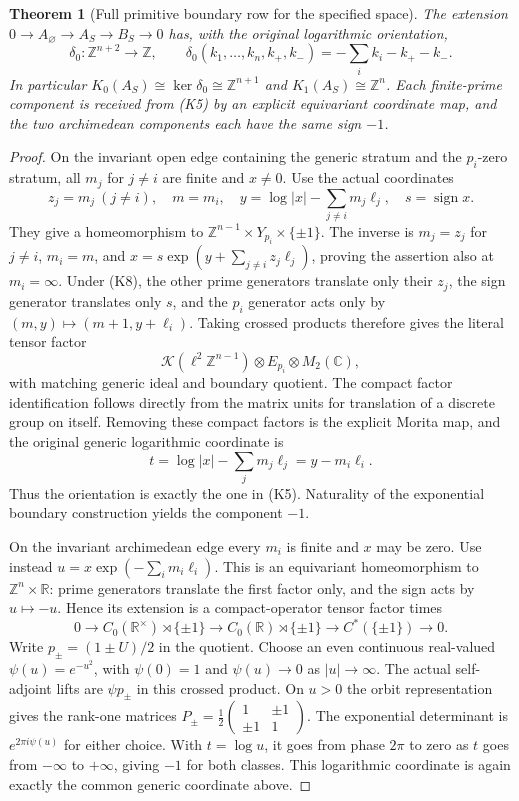 \documentclass[11pt]{article}
\newtheorem{theorem}{Theorem}[section]
\newcommand{\C}{\mathbb C}\newcommand{\R}{\mathbb R}
\begin{document}
\begin{theorem}[Full primitive boundary row for the specified space]
The extension $0\to A_\varnothing\to A_S\to B_S\to0$ has, with
the original logarithmic orientation,
\[
 \delta_0:\mathbb Z^{n+2}\longrightarrow\mathbb Z,
 \qquad
 \delta_0(k_1,\ldots,k_n,k_+,k_-)
       =-\sum_i k_i-k_+-k_-.
 \tag{K9}
\]
In particular
$K_0(A_S)\cong\ker\delta_0\cong\mathbb Z^{n+1}$ and
$K_1(A_S)\cong\mathbb Z^n$. Each finite-prime component is received
from (K5) by an explicit equivariant coordinate map, and the two
archimedean components each have the same sign $-1$.
\end{theorem}
\begin{proof}
On the invariant open edge containing the generic stratum and the
$p_i$-zero stratum, all $m_j$ for $j\ne i$ are finite and $x\ne0$.
Use the actual coordinates
\[
 z_j=m_j\ (j\ne i),\quad m=m_i,\quad
 y=\log|x|-\sum_{j\ne i}m_j\ell_j,\quad s=\operatorname{sign}x.
 \tag{K10}
\]
They give a homeomorphism to
$\mathbb Z^{n-1}\times Y_{p_i}\times\{\pm1\}$.
The inverse is
$m_j=z_j$ for $j\ne i$, $m_i=m$, and
$x=s\exp(y+\sum_{j\ne i}z_j\ell_j)$, proving the assertion also
at $m_i=\infty$. Under (K8), the other prime generators translate
only their $z_j$, the sign generator translates only $s$, and the
$p_i$ generator acts only by $(m,y)\mapsto(m+1,y+\ell_i)$.
Taking crossed products therefore gives the literal tensor factor
\[
 \mathcal K(\ell^2\mathbb Z^{n-1})\otimes E_{p_i}\otimes M_2(\C),
\]
with matching generic ideal and boundary quotient. The compact factor
identification follows directly from the matrix units for translation
of a discrete group on itself. Removing these compact factors is the
explicit Morita map, and the original generic logarithmic coordinate is
\[
 t=\log|x|-\sum_jm_j\ell_j=y-m_i\ell_i.
\]
Thus the orientation is exactly the one in (K5). Naturality of the
exponential boundary construction yields the component $-1$.

On the invariant archimedean edge every $m_i$ is finite and $x$ may
be zero. Use instead
$u=x\exp(-\sum_i m_i\ell_i)$. This is an equivariant homeomorphism
to $\mathbb Z^n\times\R$: prime generators translate the first
factor only, and the sign acts by $u\mapsto-u$. Hence its extension
is a compact-operator tensor factor times
\[
 0\to C_0(\R^\times)\rtimes\{\pm1\}
 \to C_0(\R)\rtimes\{\pm1\}
 \to C^*(\{\pm1\})\to0.
\]
Write $p_\pm=(1\pm U)/2$ in the quotient. Choose an even continuous
real-valued $\psi(u)=e^{-u^2}$, with $\psi(0)=1$ and
$\psi(u)\to0$ as $|u|\to\infty$.
The actual self-adjoint lifts are $\psi p_\pm$ in this crossed
product. On $u>0$ the orbit representation gives the rank-one matrices
$P_\pm=\frac12\left(\begin{smallmatrix}1&\pm1\\\pm1&1\end{smallmatrix}\right)$.
The exponential determinant is $e^{2\pi i\psi(u)}$ for either
choice. With $t=\log u$, it goes from phase $2\pi$ to zero as $t$
goes from $-\infty$ to $+\infty$, giving $-1$ for both classes.
This logarithmic coordinate is again exactly the common generic
coordinate above.


\end{proof}
\end{document}

